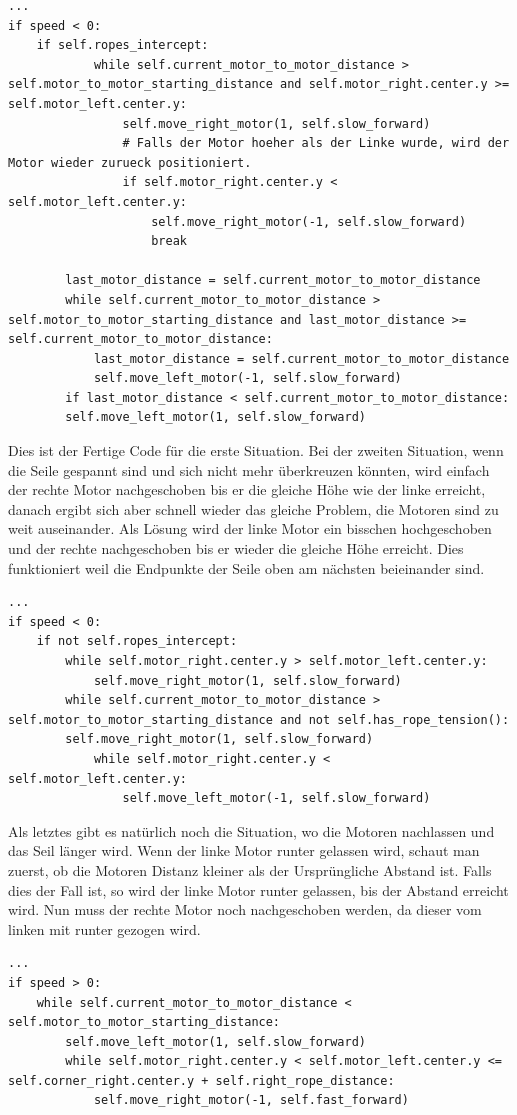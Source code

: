 \documentclass[12pt]{article}
\begin{document}
\begin{lstlisting}
...
if speed < 0:
	if self.ropes_intercept:
			while self.current_motor_to_motor_distance > self.motor_to_motor_starting_distance and self.motor_right.center.y >= self.motor_left.center.y:
				self.move_right_motor(1, self.slow_forward)
				# Falls der Motor hoeher als der Linke wurde, wird der Motor wieder zurueck positioniert.
				if self.motor_right.center.y < self.motor_left.center.y:
					self.move_right_motor(-1, self.slow_forward)
					break
					
		last_motor_distance = self.current_motor_to_motor_distance
		while self.current_motor_to_motor_distance > self.motor_to_motor_starting_distance and last_motor_distance >= self.current_motor_to_motor_distance:
			last_motor_distance = self.current_motor_to_motor_distance
			self.move_left_motor(-1, self.slow_forward)
		if last_motor_distance < self.current_motor_to_motor_distance:
		self.move_left_motor(1, self.slow_forward)
\end{lstlisting}
Dies ist der Fertige Code für die erste Situation. Bei der zweiten Situation, wenn die Seile gespannt sind und sich nicht mehr überkreuzen könnten, wird einfach der rechte Motor nachgeschoben bis er die gleiche Höhe wie der linke erreicht, danach ergibt sich aber schnell wieder das gleiche Problem, die Motoren sind zu weit auseinander. Als Lösung wird der linke Motor ein bisschen hochgeschoben und der rechte nachgeschoben bis er wieder die gleiche Höhe erreicht. Dies funktioniert weil die Endpunkte der Seile oben am nächsten beieinander sind.
\begin{lstlisting}
...
if speed < 0:
	if not self.ropes_intercept:
		while self.motor_right.center.y > self.motor_left.center.y:
			self.move_right_motor(1, self.slow_forward)
		while self.current_motor_to_motor_distance > self.motor_to_motor_starting_distance and not self.has_rope_tension():
		self.move_right_motor(1, self.slow_forward)
			while self.motor_right.center.y < self.motor_left.center.y:
				self.move_left_motor(-1, self.slow_forward)
\end{lstlisting}
Als letztes gibt es natürlich noch die Situation, wo die Motoren nachlassen und das Seil länger wird. Wenn der linke Motor runter gelassen wird, schaut man zuerst, ob die Motoren Distanz kleiner als der Ursprüngliche Abstand ist. Falls dies der Fall ist, so wird der linke Motor runter gelassen, bis der Abstand erreicht wird. Nun muss der rechte Motor noch nachgeschoben werden, da dieser vom linken mit runter gezogen wird.
\begin{lstlisting}
...
if speed > 0:
	while self.current_motor_to_motor_distance < self.motor_to_motor_starting_distance:
		self.move_left_motor(1, self.slow_forward)
		while self.motor_right.center.y < self.motor_left.center.y <= self.corner_right.center.y + self.right_rope_distance:
			self.move_right_motor(-1, self.fast_forward)
\end{lstlisting}
\end{document}
